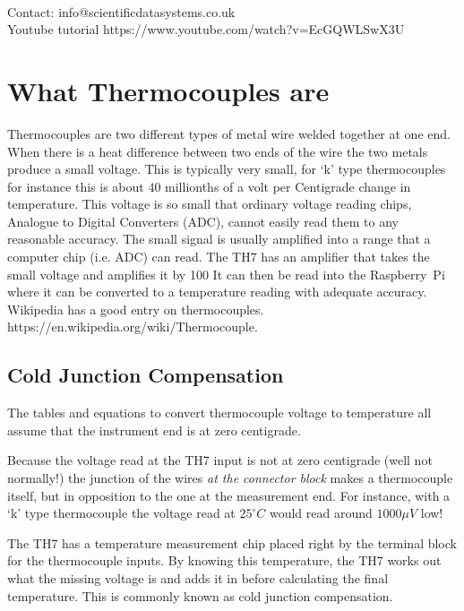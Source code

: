 \documentclass[10pt,foldmark]{leaflet}
\begin{document}
\\
\vspace{0.5cm}
Contact: info@scientificdatasystems.co.uk
\\
Youtube tutorial https://www.youtube.com/watch?v=EcGQWLSwX3U
\vspace{0.5cm}
\clearpage

\section{What Thermocouples are}

Thermocouples are two different types of metal wire welded together
at one end.
When there is a heat difference between two ends of the wire
the two metals produce a small voltage.
This is typically very small, for `k' type thermocouples for instance
this is about 40 millionths of a volt per Centigrade change in temperature.
%
This voltage is so small that ordinary voltage reading chips, Analogue to Digital Converters (ADC),  cannot easily read them
to any reasonable accuracy.
%
The small signal is usually amplified
into a range that a computer chip (i.e. ADC) can read.
The TH7 has an amplifier that takes the small voltage and amplifies it by 100
%
It can then be read into the Raspberry~Pi where it can be converted to
a temperature reading with adequate accuracy.
%
Wikipedia has a good entry on thermocouples.
https://en.wikipedia.org/wiki/Thermocouple.

\subsection{Cold Junction Compensation}

The tables and equations to convert thermocouple voltage to
temperature all assume that the instrument end is at zero centigrade.

Because the voltage read at the TH7 input is not at zero centigrade (well not normally!)
the junction of the wires {\em at the connector block}  makes a thermocouple itself, but in opposition to
the one at the measurement end. For instance, with a `k' type thermocouple
the voltage read at $25^\circ C$ would read around $1000 \mu V$ low!

The TH7 has a temperature measurement chip placed right by the terminal block for the thermocouple inputs.
By knowing this temperature, the TH7 works out what the missing voltage is
and adds it in before calculating the final temperature. This is commonly known as cold junction compensation.
\end{document}
